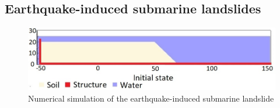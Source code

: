 \documentclass[preprint,12pt]{elsarticle}
\begin{document}
\subsection{\textsf{Earthquake-induced submarine landslides}}
%
%
\begin{figure}[H]
\center
\includegraphics[scale=0.5]{schematic.jpeg}
\caption{Numerical simulation of the earthquake-induced submarine landslide}
\label{fig:scheme}
\end {figure}
%
%
\end{document}
